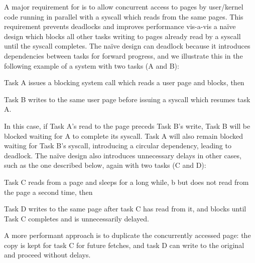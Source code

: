 \documentclass[letterpaper,twocolumn,10pt, anonymous]{article}
\begin{document}
A major requirement for \tiktok is to allow concurrent access to pages
by user/kernel code running in parallel with a syscall which reads from 
the same pages.
This requirement prevents deadlocks and improves performance vis-a-vis
a na\"ive design which blocks all other tasks writing to pages already 
read by a syscall until the syscall completes.
The na\"ive design can deadlock because it introduces dependencies between
tasks for forward progress, and we illustrate this in the following example
of a system with two tasks (A and B):
\begin{inparaenum}
  \item Task A issues a blocking system call which reads a user page and blocks, then
  \item Task B writes to the same user page before issuing a syscall which 
  resumes task A. 
\end{inparaenum}
In this case, if Task A's read to the page preceds Task B's write, 
Task B will be blocked waiting for A to complete its syscall.
Task A will also remain blocked waiting for Task B's syscall, 
introducing a circular dependency, leading to deadlock.
The na\"ive design also introduces unnecessary delays in other cases, 
such as the one described below, again with two tasks (C and D):
\begin{inparaenum}
  \item Task C reads from a page and sleeps for a long while, b
        but does not read from the page a second time, then
  \item Task D writes to the same page after task C has read from it, 
        and blocks until Task C completes and is unnecessarily delayed.
\end{inparaenum}
A more performant approach is to duplicate the concurrently accessed page: 
the copy is kept for task C for future fetches, and task D
can write to the original and proceed without delays.
\end{document}

